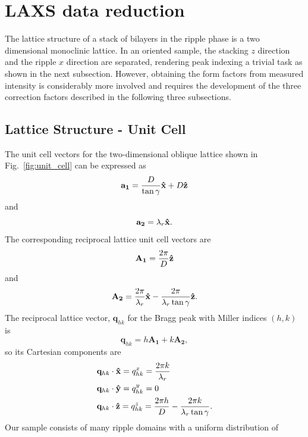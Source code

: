 \newpage
\section{LAXS data reduction}\label{sec:LAXS_data_reduction}
The lattice structure of a stack of bilayers in the ripple  phase is a two 
dimensional monoclinic lattice. 
In an oriented sample, the stacking $z$ direction and the ripple
$x$ direction are separated, rendering peak indexing a trivial task as 
shown in the next subsection.
However, obtaining the form factors from measured intensity is considerably
more involved and requires the development of the three correction factors 
described in the following three subsections.

\subsection{Lattice Structure - Unit Cell}\label{sec:lattice_structure}
The unit cell vectors for the two-dimensional oblique lattice shown in Fig.~\ref{fig:unit_cell}
can be expressed as 
\begin{equation}
  \mathbf{a_1} = \frac{D}{\tan\gamma}\mathbf{\hat{x}} + D\mathbf{\hat{z}}
\end{equation}
and
\begin{equation}
  \mathbf{a_2} = \lambda_r\mathbf{\hat{x}}.
\end{equation}
The corresponding reciprocal lattice unit cell vectors are
\begin{equation}
  \mathbf{A_1} = \frac{2\pi}{D}\mathbf{\hat{z}}
\end{equation}
and
\begin{equation}
  \mathbf{A_2} = \frac{2\pi}{\lambda_r}\mathbf{\hat{x}} - \frac{2\pi}{\lambda_r\tan\gamma}\mathbf{\hat{z}}.
\end{equation}
The reciprocal lattice vector, $\mathbf{q}_{hk}$ for the Bragg peak with 
Miller indices $(h,k)$ is 
\begin{equation}
  \mathbf{q}_{hk}=h\mathbf{A_1}+k\mathbf{A_2},
\end{equation}
so its Cartesian components are
\begin{align}
  & \mathbf{q}_{hk}\cdot\mathbf{\hat{x}} = q_{hk}^x = \frac{2\pi k}{\lambda_r}\\
  & \mathbf{q}_{hk}\cdot\mathbf{\hat{y}} = q_{hk}^y = 0 \\
  & \mathbf{q}_{hk}\cdot\mathbf{\hat{z}} = q_{hk}^z = \frac{2\pi h}{D} - \frac{2\pi k}{\lambda_r\tan\gamma}.
\end{align}
Our sample consists of many ripple domains with a uniform distribution of 

